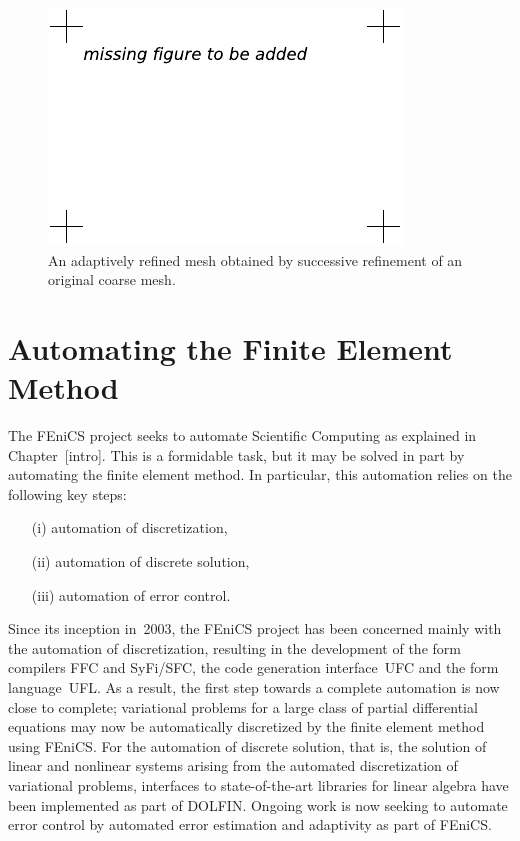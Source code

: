 \begin{figure}
  \begin{center}
    \includegraphics[width=\largefig]{chapters/kirby-7/pdf/missing-figure.pdf}
    \caption{An adaptively refined mesh obtained by successive
      refinement of an original coarse mesh.}
    \label{fig:refinement}
  \end{center}
\end{figure}

\section{Automating the Finite Element Method}

The FEniCS project seeks to automate Scientific Computing as explained
in Chapter~[intro]. This is a formidable task, but it may be solved in
part by automating the finite element method. In particular, this
automation relies on the following key steps:
\begin{itemize}
\item[(i)]
  automation of discretization,
\item[(ii)]
  automation of discrete solution,
\item[(iii)]
  automation of error control.
\end{itemize}
Since its inception in~2003, the FEniCS project has been concerned
mainly with the automation of discretization, resulting in the
development of the form compilers FFC and SyFi/SFC, the code
generation interface~UFC and the form language~UFL. As a result, the
first step towards a complete automation is now close to complete;
variational problems for a large class of partial differential
equations may now be automatically discretized by the finite element
method using FEniCS. For the automation of discrete solution, that is,
the solution of linear and nonlinear systems arising from the
automated discretization of variational problems, interfaces to
state-of-the-art libraries for linear algebra have been implemented as
part of DOLFIN. Ongoing work is now seeking to automate error control
by automated error estimation and adaptivity as part of FEniCS.

